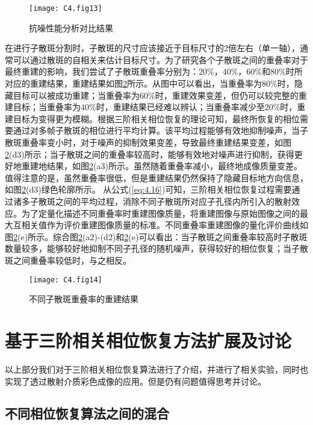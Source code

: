 \begin{figure}[htp]
	\centering
	\texttt{[image: C4.fig13]}
	\caption{抗噪性能分析对比结果}
	\label{fig:4.13}
\end{figure}

在进行子散斑分割时，子散斑的尺寸应该接近于目标尺寸的2倍左右（单一轴），通常可以通过散斑的自相关来估计目标尺寸。为了研究各个子散斑之间的重叠率对于最终重建的影响，我们尝试了子散斑重叠率分别为：$20\%$，$40\%$，$60\%$和$80\%$时所对应的重建结果，重建结果如图\ref{fig:4.14}所示。从图中可以看出，当重叠率为$80\%$时，隐藏目标可以被成功重建；当重叠率为$60\%$时，重建效果变差，但仍可以较完整的重建目标；当重叠率为$40\%$时，重建结果已经难以辨认；当重叠率减少至$20\%$时，重建目标为变得更为模糊。根据三阶相关相位恢复的理论可知，最终所恢复的相位需要通过对多帧子散斑的相位进行平均计算。该平均过程能够有效地抑制噪声，当子散斑重叠率变小时，对于噪声的抑制效果变差，导致最终重建结果变差，如图\ref{fig:4.14}(d3)所示；当子散斑之间的重叠率较高时，能够有效地对噪声进行抑制，获得更好地重建地结果，如图\ref{fig:4.14}(a3)所示。虽然随着重叠率减小，最终地成像质量变差。值得注意的是，虽然重叠率很低，但是重建结果仍然保持了隐藏目标地方向信息，如图\ref{fig:4.14}(d3)绿色轮廓所示。
从公式(\ref{eq:4.16})可知，三阶相关相位恢复过程需要通过诸多子散斑之间的平均过程，消除不同子散斑所对应子孔径内所引入的散射效应。为了定量化描述不同重叠率时重建图像质量，将重建图像与原始图像之间的最大互相关值作为评价重建图像质量的标准。不同重叠率重建图像的量化评价曲线如图\ref{fig:4.14}(e)所示。综合图\ref{fig:4.14}(a2)-(d2)和\ref{fig:4.14}(e)可以看出：当子散斑之间重叠率较高时子散斑数量较多，能够较好地抑制不同子孔径的随机噪声，获得较好的相位恢复；当子散斑之间重叠率较低时，与之相反。

\begin{figure}[htp]
	\centering
	\texttt{[image: C4.fig14]}
	\caption{不同子散斑重叠率的重建结果}
	\label{fig:4.14}
\end{figure}

\section{基于三阶相关相位恢复方法扩展及讨论}

以上部分我们对于三阶相关相位恢复算法进行了介绍，并进行了相关实验，同时也实现了透过散射介质彩色成像的应用。但是仍有问题值得思考并讨论。

\subsection{不同相位恢复算法之间的混合}

